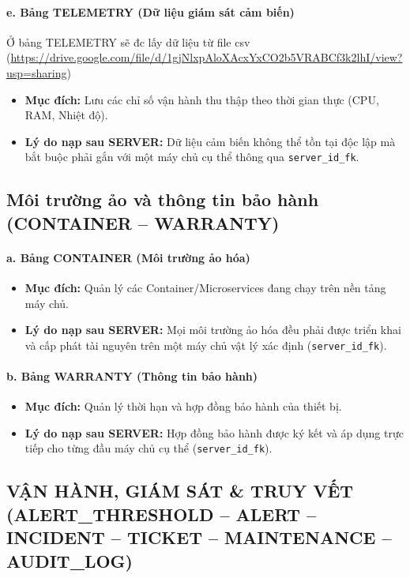 \paragraph{e. Bảng TELEMETRY (Dữ liệu giám sát cảm biến)}
\noindent Ở bảng TELEMETRY sẽ đc lấy dữ liệu từ file csv (\url{https://drive.google.com/file/d/1gjNlxpAloXAcxYxCO2b5VRABCf3k2lhI/view?usp=sharing})
\begin{itemize}
    \item \textbf{Mục đích:} Lưu các chỉ số vận hành thu thập theo thời gian thực (CPU, RAM, Nhiệt độ).
    \item \textbf{Lý do nạp sau SERVER:} Dữ liệu cảm biến không thể tồn tại độc lập mà bắt buộc phải gắn với một máy chủ cụ thể thông qua \texttt{server\_id\_fk}.
\end{itemize}

\subsection{Môi trường ảo và thông tin bảo hành (CONTAINER -- WARRANTY)}

\paragraph{a. Bảng CONTAINER (Môi trường ảo hóa)}
\begin{itemize}
    \item \textbf{Mục đích:} Quản lý các Container/Microservices đang chạy trên nền tảng máy chủ.
    \item \textbf{Lý do nạp sau SERVER:} Mọi môi trường ảo hóa đều phải được triển khai và cấp phát tài nguyên trên một máy chủ vật lý xác định (\texttt{server\_id\_fk}).
\end{itemize}

\paragraph{b. Bảng WARRANTY (Thông tin bảo hành)}
\begin{itemize}
    \item \textbf{Mục đích:} Quản lý thời hạn và hợp đồng bảo hành của thiết bị.
    \item \textbf{Lý do nạp sau SERVER:} Hợp đồng bảo hành được ký kết và áp dụng trực tiếp cho từng đầu máy chủ cụ thể (\texttt{server\_id\_fk}).
\end{itemize}

\subsection{VẬN HÀNH, GIÁM SÁT \& TRUY VẾT (ALERT\_THRESHOLD -- ALERT -- INCIDENT -- TICKET -- MAINTENANCE -- AUDIT\_LOG)}

